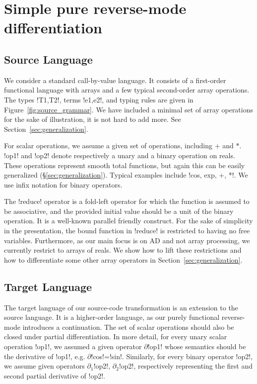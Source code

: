 \section{Simple pure reverse-mode differentiation}
\label{sec:simplediff}

\subsection{Source Language}
\label{sub:sourcelang}

We consider a standard call-by-value language. 
It consists of a first-order functional language with arrays and a few typical second-order array operations. 
The types !T1,T2!, terms !e1,e2!, and typing rules are given in Figure~\ref{fig:source_grammar}.
We have included a minimal set of array operations for the sake of illustration,  it is not hard to add more.
See Section~\ref{sec:generalization}.



For scalar operations, we assume a given set of operations, including $+$ and $*$. 
!op1! and !op2! denote respectively a unary and a binary operation on reals. 
These operations represent smooth total functions, 
but again this can be easily generalized (\S\ref{sec:generalization}).  
Typical examples include !cos, exp, +, *!. 
We use infix notation for binary operators.

The !reduce! operator is a fold-left operator for which the function is assumed to be associative, 
and the provided initial value should be a unit of the binary operation.
It is a well-known parallel friendly construct. 
For the sake of simplicity in the presentation, the bound function in !reduce! 
is restricted to having no free variables. Furthermore, as our main focus is on AD and not array processing,
we currently restrict to arrays of reals.
We show how to lift these restrictions and how to differentiate some other array operators in Section~\ref{sec:generalization}.

\subsection{Target Language}

The target language of our source-code transformation is an extension to the source language.
It is a higher-order language, as our purely functional reverse-mode introduces a continuation.
The set of scalar operations should also be closed under partial differentiation. 
In more detail, for every unary scalar operation !op1!, 
we assumed a given operator $\partial$!op1! whose semantics should be the derivative of !op1!, e.g. $\partial$!cos!=!sin!.
Similarly, for every binary operator !op2!, we assume given operators $\partial_1$!op2!, $\partial_2$!op2!, 
respectively representing the first and second partial derivative of !op2!.

